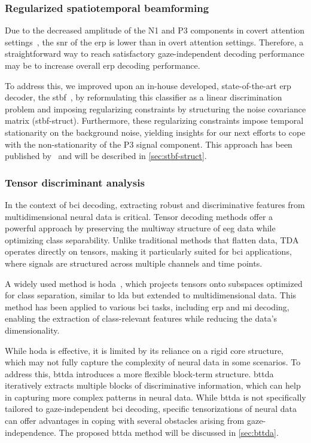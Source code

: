 \subsubsection{Regularized spatiotemporal beamforming}

Due to the decreased amplitude of the N1 and P3 components in covert attention
settings~\cite{Treder2010}, the \ac{snr} of
the \ac{erp} is lower than in overt attention settings.
Therefore, a straightforward way to reach satisfactory
gaze-independent decoding performance may be to increase overall \ac{erp}
decoding performance.

To address this, we improved upon an in-house developed, state-of-the-art \ac{erp}
decoder, the \ac{stbf}~\cite{Wittevrongel2016}, by reformulating
this classifier as a linear discrimination problem and
imposing regularizing constraints by structuring the noise covariance matrix
(\acs{stbf-struct}).
Furthermore, these regularizing constraints impose temporal stationarity on
the background noise, yielding insights for our next
efforts to cope with the non-stationarity of the P3 signal component.
This approach has been published by~\textcite{VanDenKerchove2022} and will be
described in \cref{sec:stbf-struct}.

\subsubsection{Tensor discriminant analysis}

In the context of \ac{bci} decoding, extracting robust and discriminative
features from multidimensional neural data is critical.
Tensor decoding methods offer a powerful approach by preserving the multiway structure
of \ac{eeg} data while optimizing class separability.
Unlike traditional methods that flatten data, TDA operates directly on tensors,
making it particularly suited for \ac{bci} applications, where signals are structured
across multiple channels and time points.

A widely used method is \ac{hoda}~\cite{Phan2010}, which projects tensors onto subspaces
optimized for class separation, similar to \ac{lda} but extended to multidimensional data.
This method has been applied to various \ac{bci} tasks, including \ac{erp} and
\ac{mi} decoding, enabling the extraction of class-relevant features while reducing
the data's dimensionality.

While \ac{hoda} is effective, it is limited by its reliance on a rigid core
structure, which may not fully capture the complexity of neural data in some
scenarios. To address this, \ac{bttda}
introduces a more flexible block-term structure.
\ac{bttda} iteratively extracts multiple blocks of
discriminative information, which can help in capturing more complex patterns
in neural data.
While \ac{bttda} is not specifically tailored to
gaze-independent \ac{bci} decoding, specific tensorizations of neural data can
offer advantages in coping with several obstacles arising from
gaze-independence.
The proposed \ac{bttda} method will be discussed in \cref{sec:bttda}.

